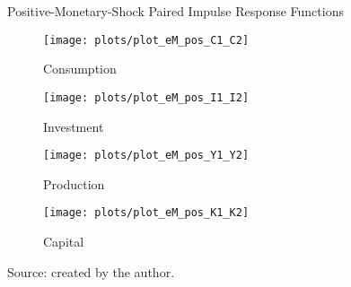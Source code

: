 \documentclass[../thesis.tex]{subfiles}
\begin{document}
\begin{figure}[h!]
	\centering
	\caption{Positive-Monetary-Shock Paired Impulse Response Functions}
	\begin{subfigure}[b]{0.48\textwidth}
		\centering
		\texttt{[image: plots/plot\_eM\_pos\_C1\_C2]}
		\caption{\scriptsize Consumption}
		\label{fig:plot_eM_pos_C1_C2}
	\end{subfigure}
	\hspace*{0.3cm}
	\begin{subfigure}[b]{0.48\textwidth}
		\centering
		\texttt{[image: plots/plot\_eM\_pos\_I1\_I2]}
		\caption{\scriptsize Investment}
		\label{fig:plot_eM_pos_I1_I2}
	\end{subfigure}
	\vspace*{0.1cm}
	\begin{subfigure}[b]{0.48\textwidth}
		\centering
		\texttt{[image: plots/plot\_eM\_pos\_Y1\_Y2]}
		\caption{\scriptsize Production}
		\label{fig:plot_eM_pos_Y1_Y2}
	\end{subfigure}
	\hspace*{0.3cm}
	\begin{subfigure}[b]{0.48\textwidth}
		\centering
		\texttt{[image: plots/plot\_eM\_pos\_K1\_K2]}
		\caption{\scriptsize Capital}
		\label{fig:plot_eM_pos_K1_K2}
	\end{subfigure}
	\caption*{Source: created by the author.}
	\label{fig:paired_pos_irf}
\end{figure}

\newpage
\end{document}
